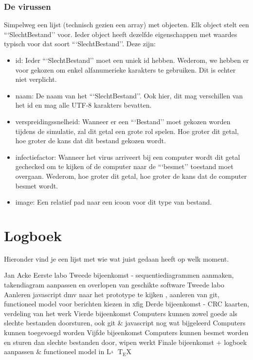 \documentclass[a4paper,oneside]{report}
\def\latex{$\mathrm{L\!\!^{{}_{\scriptstyle A}} \!\!\!\!\!\;\; T\!_{\displaystyle E} \!
X}$}
\begin{document}
\subsection{De virussen}
Simpelweg een lijst (technisch gezien een array) met objecten. Elk object stelt een ```SlechtBestand'' voor.
Ieder object heeft dezelfde eigenschappen met waardes typisch voor dat soort ```SlechtBestand''.
Deze zijn:
\begin{itemize}
    \item id: Ieder ```SlechtBestand'' moet een uniek id hebben. Wederom, we hebben er voor gekozen om enkel alfanumerieke karakters te gebruiken. Dit is echter niet verplicht.
    \item naam: De naam van het ```SlechtBestand''. Ook hier, dit mag verschillen van het id en mag alle UTF-8 karakters bevatten.
    \item verspreidingssnelheid: Wanneer er een ```Bestand'' moet gekozen worden tijdens de simulatie, zal dit getal een grote rol spelen.
    		Hoe groter dit getal, hoe groter de kans dat dit bestand gekozen wordt.
    \item infectiefactor: Wanneer het virus arriveert bij een computer wordt dit getal gechecked om te kijken of de computer naar de ```besmet'' toestand moet overgaan.
    		Wederom, hoe groter dit getal, hoe groter de kans dat de computer besmet wordt.
    \item image: Een relatief pad naar een icoon voor dit type van bestand.
\end{itemize}



\chapter{Logboek}
Hieronder vind je een lijst met wie wat juist gedaan heeft op welk moment.
\begin{studentlog}{Jan Acke}
{Eerste labo}
{Tweede bijeenkomst - sequentiediagrammen aanmaken, takendiagram aanpassen en overlopen van geschikte software}
{Tweede labo}
{Aanleren javascript dmv naar het prototype te kijken , aanleren van git, functioneel model voor berichten kiezen in xfig}
{Derde bijeenkomst - CRC kaarten, verdeling van het werk}
{Vierde bijeenkomst}
{Computers kunnen zowel goede als slechte bestanden doorsturen, ook git \& javascript nog wat bijgeleerd}
{Computers kunnen toegevoegd worden}
{Vijfde bijeenkomst}
{Computers kunnen besmet worden en sturen dan slechte bestanden door, wipen werkt}
{Finale bijeenkomst + logboek aanpassen \& functioneel model in \latex}
\end{studentlog}
\end{document}
